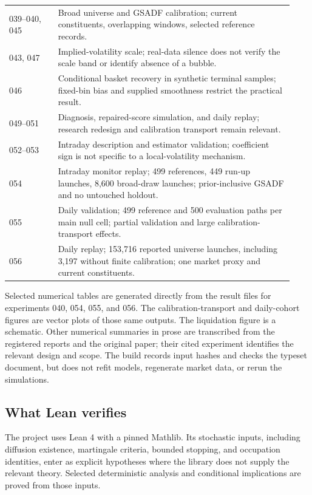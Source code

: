 \begin{longtable}{@{}L{0.16\linewidth}L{0.77\linewidth}@{}}
039--040, 045 & Broad universe and GSADF calibration; current constituents,
overlapping windows, selected reference records.\\
043, 047 & Implied-volatility scale; real-data silence does not verify
the scale band or identify absence of a bubble.\\
046 & Conditional basket recovery in synthetic terminal samples; fixed-bin
bias and supplied smoothness restrict the practical result.\\
049--051 & Diagnosis, repaired-score simulation, and daily replay; research
redesign and calibration transport remain relevant.\\
052--053 & Intraday description and estimator validation; coefficient
sign is not specific to a local-volatility mechanism.\\
054 & Intraday monitor replay; 499 references, 449 run-up launches,
8,600 broad-draw launches; prior-inclusive GSADF and no untouched holdout.\\
055 & Daily validation; 499 reference and 500 evaluation paths per main
null cell; partial validation and large calibration-transport effects.\\
056 & Daily replay; 153,716 reported universe launches, including 3,197
without finite calibration; one market proxy and current constituents.\\
\bottomrule
\end{longtable}

Selected numerical tables are generated directly from the result files
for experiments 040, 054, 055, and 056. The calibration-transport and
daily-cohort figures are vector plots of those same outputs. The
liquidation figure is a schematic. Other numerical summaries in prose
are transcribed from the registered reports and the original paper;
their cited experiment identifies the relevant design and scope.
The build records input hashes and checks the typeset document, but
does not refit models, regenerate market data, or rerun the simulations.

\subsection{What Lean verifies}
The project uses Lean 4 with a pinned Mathlib. Its stochastic inputs,
including diffusion existence, martingale criteria, bounded stopping,
and occupation identities, enter as explicit hypotheses where the
library does not supply the relevant theory. Selected deterministic
analysis and conditional implications are proved from those inputs.

